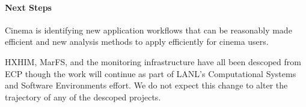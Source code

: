 \paragraph{Next Steps}
Cinema is identifying new application workflows that can be reasonably made
efficient and new analysis methods to apply efficiently for cinema
users.

HXHIM, MarFS, and the monitoring infrastructure have all been descoped
from ECP though the work will continue as part of LANL's Computational Systems
and Software Environments effort. We do not expect this change to alter the
trajectory of any of the descoped projects.
